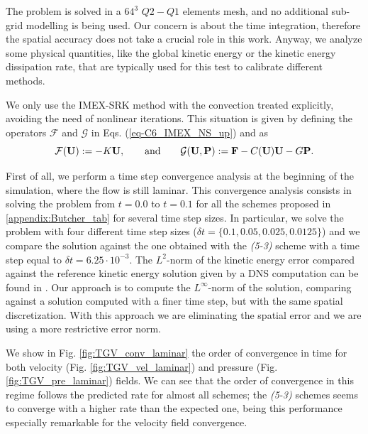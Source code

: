 The problem is solved in a $64^3$ $Q2-Q1$ elements mesh, and no additional sub-grid modelling is being used. Our concern is about the time integration, therefore the spatial accuracy does not take a crucial role in this work. Anyway, we analyze some physical quantities, like the global kinetic energy or the kinetic energy dissipation rate, that are typically used for this test to calibrate different methods.

We only use the IMEX-SRK method with the convection treated explicitly, avoiding the need of nonlinear iterations. This situation is given by defining the operators $\mathcal{F}$ and $\mathcal{G}$ in  Eqs. (\ref{eq-C6_IMEX_NS_up}) and  as
$$\mathcal{F}({\bf U}):=-K{\bf U},\quad\quad\mbox{and}\quad\quad\mathcal{G}({\bf U},{\bf P}):={\bf F}-C({\bf U}){\bf U}-G{\bf P}.$$

First of all, we perform a time step convergence analysis at the beginning of the simulation, where the flow is still laminar. This convergence analysis consists in solving the problem from $t=0.0$ to $t=0.1$ for all the schemes proposed in \ref{appendix:Butcher_tab} for several time step sizes. In particular, we solve the problem with four different time step sizes ($\delta t=\{0.1,0.05,0.025,0.0125\}$) and we compare the solution against the one obtained with the \textit{(5-3)} scheme with a time step equal to $\delta t=6.25\cdot10^{-3}$. The $L^2$-norm of the kinetic energy error compared against the reference kinetic energy solution given by a DNS computation can be found in  \cite{boom_time-accurate_????}. Our approach is to compute the $L^{\infty}$-norm of the solution, comparing against a solution computed with a finer time step, but with the same spatial discretization. With this approach we are eliminating the spatial error and we are using a more restrictive error norm.

We show in Fig. \ref{fig:TGV_conv_laminar} the order of convergence in time for both velocity (Fig. \ref{fig:TGV_vel_laminar}) and pressure (Fig. \ref{fig:TGV_pre_laminar}) fields. We can see that the order of convergence in this regime follows the predicted rate for almost all schemes; the \textit{(5-3)} schemes seems to converge with a higher rate than the expected one, being this performance especially remarkable for the velocity field convergence.

